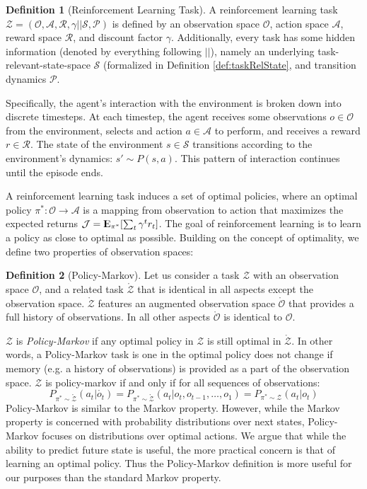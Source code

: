 \documentclass{article} %
\newcommand{\Expect}{{\rm I\kern-.3em E}}
\theoremstyle{definition}
\newtheorem{definition}{Definition}[section]
\begin{document}
\begin{definition}[Reinforcement Learning Task]
\label{def:markov}
A reinforcement learning task $\mathcal{Z} = (\mathcal{O},
\mathcal{A}, \mathcal{R}, \gamma || \mathcal{S}, \mathcal{P})$ is
defined by an observation space $\mathcal{O}$, action space
$\mathcal{A}$, reward space $\mathcal{R}$, and discount factor
$\gamma$. Additionally, every task has some hidden information
(denoted by everything following $||$), namely an underlying
task-relevant-state-space $\mathcal{S}$ (formalized in Definition
\ref{def:taskRelState}, and transition dynamics $\mathcal{P}$.

Specifically, the agent's interaction with the environment is broken
down into discrete timesteps. At each timestep, the agent receives
some observations $o \in \mathcal{O}$ from the environment, selects
and action $a \in \mathcal{A}$ to perform, and receives a reward $r \in
\mathcal{R}$. The state of the environment $s \in \mathcal{S}$
transitions according to the environment's dynamics: $s' \sim
P(s,a)$. This pattern of interaction continues until the episode ends.
\end{definition}

A reinforcement learning task induces a set of optimal policies, where
an optimal policy $\pi^*: \mathcal{O} \rightarrow \mathcal{A}$ is a
mapping from observation to action that maximizes the expected returns
$\mathcal{J} = \Expect_{\pi^*}[\sum_{t} \gamma^t r_t]$. The goal of
reinforcement learning is to learn a policy as close to optimal as
possible. Building on the concept of optimality, we define two
properties of observation spaces:

\begin{definition}[Policy-Markov]
Let us consider a task $\mathcal{Z}$ with an observation space
$\mathcal{O}$, and a related task $\mathring{\mathcal{Z}}$ that is
identical in all aspects except the observation
space. $\mathring{\mathcal{Z}}$ features an augmented observation
space $\mathring{\mathcal{O}}$ that provides a full history of
observations. In all other aspects $\mathring{\mathcal{O}}$ is
identical to $\mathcal{O}$.

$\mathcal{Z}$ is \textit{Policy-Markov} if any optimal policy in
$\mathcal{Z}$ is still optimal in $\mathring{\mathcal{Z}}$. In other
words, a Policy-Markov task is one in the optimal policy does not
change if memory (e.g. a history of observations) is provided as a
part of the observation space. $\mathcal{Z}$ is policy-markov if and
only if for all sequences of observations:
\[
P_{\pi^* \sim \mathring{\mathcal{Z}}}(a_t | \mathring{o_{t}}) = P_{\pi^* \sim \mathring{\mathcal{Z}}}(a_t | o_{t}, o_{t-1}, \dots, o_{1}) = P_{\pi^* \sim \mathcal{Z}}(a_t | o_{t})
\]
Policy-Markov is similar to the Markov property. However, while the
Markov property is concerned with probability distributions over next
states, Policy-Markov focuses on distributions over optimal
actions. We argue that while the ability to predict future state is
useful, the more practical concern is that of learning an optimal
policy. Thus the Policy-Markov definition is more useful for our
purposes than the standard Markov property.
\end{definition}
\end{document}

